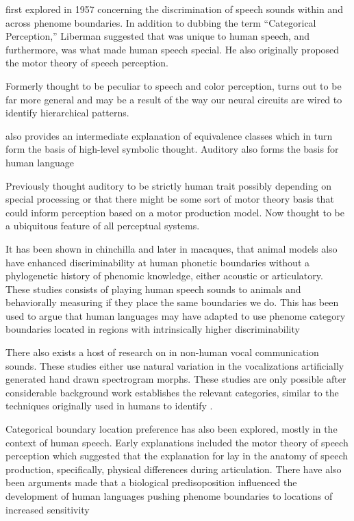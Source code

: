 \CP first explored in 1957 concerning the discrimination of speech sounds within and across phenome boundaries\cite{liberman1957discrimination}.  In addition to dubbing the term ``Categorical Perception,'' Liberman suggested that \CP was unique to human speech, and furthermore, was what made human speech special. He also originally proposed the motor theory of speech perception\cite{liberman1967perception}.

Formerly thought to be peculiar to speech and color perception, \CP turns out to be far more general and may be a result of the way our neural circuits are wired to identify hierarchical patterns.

\CP also provides an intermediate explanation of equivalence classes which in turn form the basis of high-level symbolic thought.
Auditory \CP also forms the basis for human language

Previously thought auditory \CP to be strictly human trait possibly depending on special processing or that there might be some sort of motor theory basis that could inform perception based on a motor production model.
Now thought to be a ubiquitous feature of all perceptual systems.

It has been shown in chinchilla\cite{kuhl1975speech} and later in macaques\cite{kuhl1983enhanced}, that animal models also have enhanced discriminability at human phonetic boundaries without a phylogenetic history of phenomic knowledge, either acoustic or articulatory.
These studies consists of playing human speech sounds to animals and behaviorally measuring if they place the same boundaries we do.
This has been used to argue that human languages may have adapted to use phenome category boundaries located in regions with intrinsically higher discriminability\cite{stevens1981constraints,goldstone2010categorical}

There also exists a host of research on \CP in non-human vocal communication sounds. These studies either use
natural variation in the vocalizations
artificially generated hand drawn spectrogram morphs.
These studies are only possible after considerable background work establishes the relevant categories, similar to the techniques originally used in humans to identify \CP.

Categorical boundary location preference has also been explored, mostly in the context of human speech. Early explanations included the motor theory of speech perception which suggested that the explanation for \CP lay in the anatomy of speech production, specifically, physical differences during articulation\cite{liberman1967perception}. There have also been arguments made that a biological predisoposition influenced the development of human languages pushing phenome boundaries to locations of increased sensitivity\cite{stevens1981constraints, goldstone2010categorical, halle1979some}

